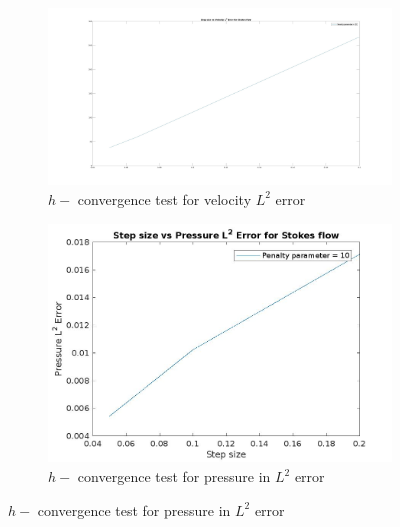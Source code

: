 \documentclass[a4paper]{book}
\begin{document}
\begin{figure}
\begin{subfigure}{\textwidth}	
  \includegraphics[width=\linewidth]{l2_velocity_stokes.jpg}
  \caption{$h-$ convergence test for velocity $L^2$ error}
  \label{fig:vel_stoke_conv}
\end{subfigure}
\begin{subfigure}{\textwidth}	
  \includegraphics[width=\linewidth]{l2_pressure_stokes.jpg}
  \caption{$h-$ convergence test for pressure in $L^2$ error}
  \label{fig:pre_stoke_conv}
\end{subfigure}
\end{figure}
\end{document}

